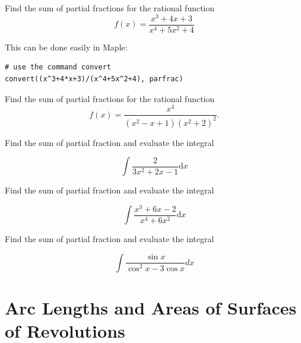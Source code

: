 \documentclass[]{book}
\theoremstyle{definition}
\theoremstyle{definition}
\theoremstyle{definition}
\theoremstyle{remark}
\let\BeginKnitrBlock\begin \let\EndKnitrBlock\end
\begin{document}
\BeginKnitrBlock{example}
\protect\hypertarget{exm:unnamed-chunk-1}{}{\label{exm:unnamed-chunk-1} }
Find the sum of partial fractions for the rational function
\[
f(x)=\frac{x^3+4x+3}{x^4+5x^2+4}
\]
\EndKnitrBlock{example}

\BeginKnitrBlock{solution}
{}
This can be done easily in Maple:

\begin{verbatim}
# use the command convert
convert((x^3+4*x+3)/(x^4+5x^2+4), parfrac)
\end{verbatim}
\EndKnitrBlock{solution}

\BeginKnitrBlock{exercise}
\protect\hypertarget{exr:unnamed-chunk-3}{}{\label{exr:unnamed-chunk-3} }
Find the sum of partial fractions for the rational function
\[
f(x)=\frac{x^{4}}{\left(x^{2}-x+1\right)\left(x^{2}+2\right)^{2}}.
\]
\EndKnitrBlock{exercise}

\BeginKnitrBlock{exercise}
\protect\hypertarget{exr:unnamed-chunk-4}{}{\label{exr:unnamed-chunk-4} }
Find the sum of partial fraction and evaluate the integral

\[
\int \frac{2}{3x^{2}+2x-1} \mathrm{d} x
\]
\EndKnitrBlock{exercise}

\BeginKnitrBlock{exercise}
\protect\hypertarget{exr:unnamed-chunk-5}{}{\label{exr:unnamed-chunk-5} }
Find the sum of partial fraction and evaluate the integral

\[
\int \frac{x^{3}+6 x-2}{x^{4}+6 x^{2}} \mathrm{d} x
\]
\EndKnitrBlock{exercise}

\BeginKnitrBlock{exercise}
\protect\hypertarget{exr:unnamed-chunk-6}{}{\label{exr:unnamed-chunk-6} }
Find the sum of partial fraction and evaluate the integral

\[
\int \frac{\sin x}{\cos ^{2} x-3 \cos x} d x
\]
\EndKnitrBlock{exercise}

\hypertarget{arc-lengths-and-areas-of-surfaces-of-revolutions}{%
\chapter{Arc Lengths and Areas of Surfaces of Revolutions}\label{arc-lengths-and-areas-of-surfaces-of-revolutions}}
\end{document}
